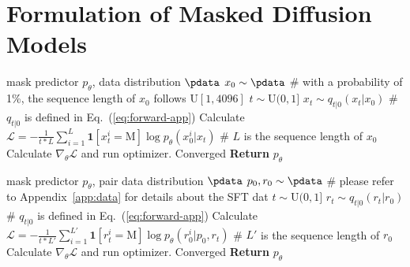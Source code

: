 \documentclass{article}
\begin{document}







\newpage
\appendix

\section{Formulation of Masked Diffusion Models}
\label{app:formulation}






\begin{algorithm}[t!]
    \caption{Pre-training of LLaDA}
    \label{alg:pretrain}
    \begin{algorithmic}[1]
        \REQUIRE mask predictor $p_{\theta}$, data distribution $\pdata$
        \REPEAT
        \STATE $x_0 \sim \pdata$ \hfill \# with a probability of 1\%, the sequence length of \( x_0 \) follows \( \text{U}[1, 4096] \)
        \STATE $t \sim \text{U}(0, 1]$
        \STATE $x_t \sim q_{t|0}(x_t|x_0)$ \hfill \# $q_{t|0}$ is defined in Eq.~(\ref{eq:forward-app})
        \STATE Calculate $ \mathcal{L} = -  \frac{1}{t * L} \sum_{ i = 1 }^L \textbf{1}[x_t^i = \textrm{M}] \log p_{\theta}(x_0^i|x_t) $ \hfill \# $L$ is the sequence length of $x_0$
        \STATE Calculate $\nabla_\theta \mathcal{L}$ and run optimizer.
        \UNTIL Converged
        \STATE \textbf{Return} $p_{\theta}$
    \end{algorithmic}
\end{algorithm}


\begin{algorithm}[t!]
    \caption{Supervised Fine-Tuning of LLaDA}
    \label{alg:sft}
    \begin{algorithmic}[1]
        \REQUIRE mask predictor $p_{\theta}$, pair data distribution $\pdata$
        \REPEAT
        \STATE $p_0, r_0 \sim \pdata$ \hfill \# please refer to Appendix~\ref{app:data} for details about the SFT dat
        \STATE $t \sim \text{U}(0, 1]$
        \STATE $r_t \sim q_{t|0}(r_t|r_0)$ \hfill \# $q_{t|0}$ is defined in Eq.~(\ref{eq:forward-app})
        \STATE Calculate $ \mathcal{L} = -  \frac{1}{t * L'} \sum_{ i = 1 }^{L'} \textbf{1}[r_t^i = \textrm{M}] \log p_{\theta}(r_0^i|p_0, r_t) $ \hfill \# $L'$ is the sequence length of $r_0$
        \STATE Calculate $\nabla_\theta \mathcal{L}$ and run optimizer.
        \UNTIL Converged
        \STATE \textbf{Return} $p_{\theta}$
    \end{algorithmic}
\end{algorithm}
\end{document}
